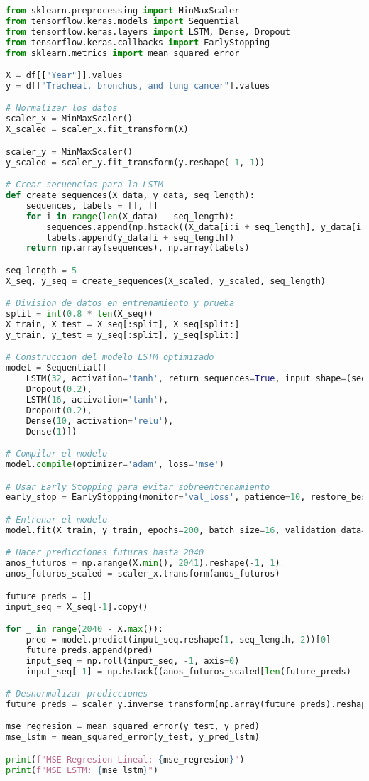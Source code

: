 \begin{lstlisting}[language=Python, caption=Modelo LSTM]
from sklearn.preprocessing import MinMaxScaler
from tensorflow.keras.models import Sequential
from tensorflow.keras.layers import LSTM, Dense, Dropout
from tensorflow.keras.callbacks import EarlyStopping
from sklearn.metrics import mean_squared_error

X = df[["Year"]].values
y = df["Tracheal, bronchus, and lung cancer"].values

# Normalizar los datos
scaler_x = MinMaxScaler()
X_scaled = scaler_x.fit_transform(X)

scaler_y = MinMaxScaler()
y_scaled = scaler_y.fit_transform(y.reshape(-1, 1))

# Crear secuencias para la LSTM
def create_sequences(X_data, y_data, seq_length):
    sequences, labels = [], []
    for i in range(len(X_data) - seq_length):
        sequences.append(np.hstack((X_data[i:i + seq_length], y_data[i:i + seq_length])))
        labels.append(y_data[i + seq_length])
    return np.array(sequences), np.array(labels)

seq_length = 5  
X_seq, y_seq = create_sequences(X_scaled, y_scaled, seq_length)

# Division de datos en entrenamiento y prueba
split = int(0.8 * len(X_seq))
X_train, X_test = X_seq[:split], X_seq[split:]
y_train, y_test = y_seq[:split], y_seq[split:]

# Construccion del modelo LSTM optimizado
model = Sequential([
    LSTM(32, activation='tanh', return_sequences=True, input_shape=(seq_length, 2)),
    Dropout(0.2),
    LSTM(16, activation='tanh'),
    Dropout(0.2),
    Dense(10, activation='relu'),
    Dense(1)])

# Compilar el modelo
model.compile(optimizer='adam', loss='mse')

# Usar Early Stopping para evitar sobreentrenamiento
early_stop = EarlyStopping(monitor='val_loss', patience=10, restore_best_weights=True)

# Entrenar el modelo
model.fit(X_train, y_train, epochs=200, batch_size=16, validation_data=(X_test, y_test), callbacks=[early_stop])

# Hacer predicciones futuras hasta 2040
anos_futuros = np.arange(X.min(), 2041).reshape(-1, 1)
anos_futuros_scaled = scaler_x.transform(anos_futuros)

future_preds = []
input_seq = X_seq[-1].copy()

for _ in range(2040 - X.max()):
    pred = model.predict(input_seq.reshape(1, seq_length, 2))[0]
    future_preds.append(pred)
    input_seq = np.roll(input_seq, -1, axis=0)
    input_seq[-1] = np.hstack((anos_futuros_scaled[len(future_preds) - 1], pred))

# Desnormalizar predicciones
future_preds = scaler_y.inverse_transform(np.array(future_preds).reshape(-1, 1))

mse_regresion = mean_squared_error(y_test, y_pred)
mse_lstm = mean_squared_error(y_test, y_pred_lstm)

print(f"MSE Regresion Lineal: {mse_regresion}")
print(f"MSE LSTM: {mse_lstm}")
\end{lstlisting}
